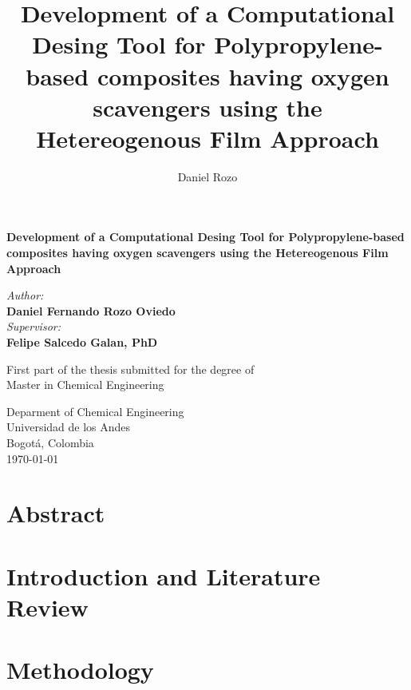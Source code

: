 \documentclass[twoside]{report}
\title{Development of a Computational Desing Tool for Polypropylene-based composites having oxygen scavengers using the Hetereogenous Film Approach}
\author{Daniel Rozo}
\date{\Today}
\begin{document}
\begin{titlepage}
\begin{center}
\BgThispage
        \huge
        \textbf{Development of a Computational Desing Tool for Polypropylene-based composites having oxygen scavengers using the Hetereogenous Film Approach}
        
        \vspace{1cm}
        \LARGE

        \vspace{4cm}
        \textit{Author:}\\
        \textbf{Daniel Fernando Rozo Oviedo}\\
        \vspace{1.5cm}
        \textit{Supervisor:}\\
        \textbf{Felipe Salcedo Galan, PhD}
        \vfill
 
        First part of the thesis submitted for the degree of\\ Master in Chemical Engineering
        
 
        \vspace{1cm}
 
        
 
        \Large
        Deparment of Chemical Engineering\\
        Universidad de los Andes\\
        Bogotá, Colombia\\
        \today
 
    \end{center}
\afterpage{\null\newpage}


\end{titlepage}

\chapter*{Abstract}

\vspace{\fill}
\pagebreak
\null\vspace{\fill}
\tableofcontents
\vspace{\fill}
\pagebreak
\pagestyle{fancy}
\chapter{Introduction and Literature Review}

\pagebreak
\chapter{Methodology}

\end{document}
